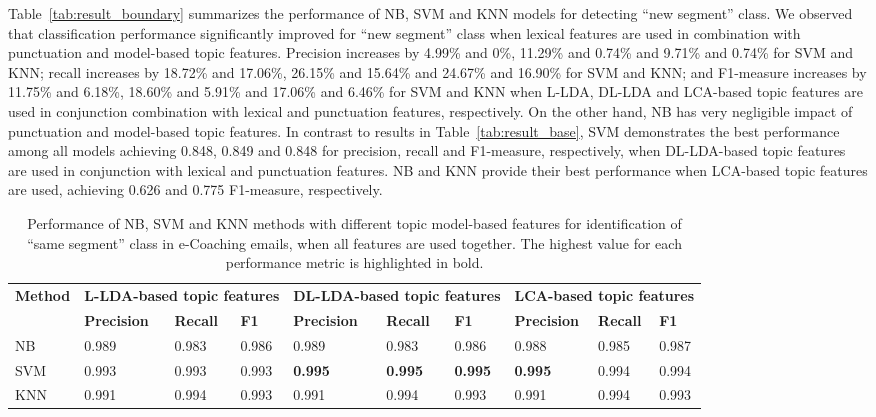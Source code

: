 \documentclass{amia}
\begin{document}
Table~\ref{tab:result_boundary} summarizes the performance of NB, SVM and KNN models for detecting ``new segment'' class. We observed that classification performance significantly improved for ``new segment'' class when lexical features are used in combination with punctuation and model-based topic features. Precision increases by 4.99\% and 0\%, 11.29\% and 0.74\% and 9.71\% and 0.74\% for SVM and KNN; recall increases by 18.72\% and 17.06\%, 26.15\% and 15.64\% and 24.67\% and 16.90\% for SVM and KNN; and F1-measure increases by 11.75\% and 6.18\%, 18.60\% and 5.91\% and 17.06\% and 6.46\% for SVM and KNN when L-LDA, DL-LDA and LCA-based topic features are used in conjunction combination with lexical and punctuation features, respectively. On the other hand, NB has very negligible impact of punctuation and model-based topic features. In contrast to results in Table~\ref{tab:result_base}, SVM demonstrates the best performance among all models achieving 0.848, 0.849 and 0.848 for precision, recall and F1-measure, respectively, when DL-LDA-based topic features are used in conjunction with lexical and punctuation features. NB and KNN provide their best performance when LCA-based topic features are used, achieving 0.626 and 0.775 F1-measure, respectively.\\ 
              

\begin{table}[ht]
\centering
\caption{Performance of NB, SVM and KNN methods with different topic model-based features for identification of ``same segment'' class in e-Coaching emails, when all features are used together. The highest value for each performance metric is highlighted in bold.}
\label{tab:result_not_boundary}
  \begin{tabular}{|l|l|l|l|l|l|l|l|l|l|}
  \hline
   \multirow{2}{*}{\textbf{Method}} & \multicolumn{3}{|c|}{\textbf{L-LDA-based topic features}} & \multicolumn{3}{|c|}{\textbf{DL-LDA-based topic features}}  & \multicolumn{3}{|c|}{\textbf{LCA-based topic features}} \\\cline{2-10} & \textbf{Precision}  & \textbf{Recall} & \textbf{F1} & \textbf{Precision}  & \textbf{Recall} & \textbf{F1} & \textbf{Precision}  & \textbf{Recall} & \textbf{F1}\\ \hline  
    
 NB & 0.989 & 0.983 & 0.986 & 0.989 & 0.983 & 0.986 & 0.988 & 0.985 & 0.987 \\ \hline
 SVM & 0.993 & 0.993 & 0.993 & \textbf{0.995} & \textbf{0.995} & \textbf{0.995} & \textbf{0.995} & 0.994 & 0.994  \\ \hline
 KNN & 0.991 & 0.994 & 0.993 & 0.991 & 0.994 & 0.993 & 0.991 & 0.994 & 0.993 \\ \hline
  \end{tabular}
\end{table}         
\end{document}
